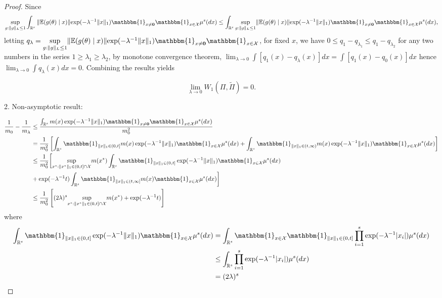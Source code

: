 \documentclass[10pt,fleqn]{article}
\newcommand{\be}{\begin{equation}\begin{aligned}}
\newcommand{\ee}{\end{aligned}\end{equation}}
\DeclareMathOperator{\1}{\mathbbm{1}}
\begin{document}
\begin{proof}[Proof]
Since 
$$ \underset{g:\|g\|_L\le 1}\sup\int_{\mathbb{R}^{s}} \| \mathbb{E}(g(\theta) \mid x) \|{ \exp(- \lambda^{-1} \| x\|_1)}   
\mathbbm{1}_{x \neq \bf 0} \mathbbm{1}_{x\in
\mathcal X}\mu^{s}(d x) \le\int_{\mathbb{R}^{s}}  \underset{g:\|g\|_L\le 1}\sup \mathbb{\|E}(g(\theta) \mid x)\|{ \exp(- \lambda^{-1} \| x\|_1)}   
\mathbbm{1}_{x \neq \bf 0} \mathbbm{1}_{x\in
\mathcal X}\mu^{s}(d x),$$
letting $q_\lambda=       \underset{g:\|g\|_L\le 1}\sup \mathbb{\|E}(g(\theta) \mid x)\|{ \exp(- \lambda^{-1} \| x\|_1)}   
\mathbbm{1}_{x \neq \bf 0}  \mathbbm{1}_{x\in
\mathcal X}$, for fixed $x$, we have $0\le q_1-q_{\lambda_1}\le q_1-q_{\lambda_2}$ for any two numbers in the series $1\ge\lambda_1\ge \lambda_2$, by monotone convergence theorem, $\lim_{\lambda\rightarrow 0}\int [ q_1(x)-q_\lambda(x)]dx = \int [q_1(x)- q_0(x) ]dx$ hence $\lim_{\lambda\rightarrow 0}\int q_\lambda(x)dx =0$. Combining the results yields 



\begin{equation}
\underset{\lambda \rightarrow 0}\lim W_1(\Pi,\tilde\Pi)=0.        \end{equation}

2. Non-asymptotic result:


\begin{equation}
\label{wass1}
\begin{aligned}
\frac{1}{m_0}-\frac{1}{m_\lambda} & \le  \frac{    \int_{\mathbb{R}^{s}}  m(x)\exp(- \lambda^{-1} \| x\|_1 )\mathbbm{1}_{x \neq \bf 0}\mathbbm{1}_{x\in
\mathcal X}\mu^{s}(d x) } {  m_0^2}  \\
&= \frac{1}{ m_0^2} \left[ \int_{\mathbb{R}^{s}} \mathbbm{1}_{\|x\|_1\in(0,t]}  m(x) \exp(- \lambda^{-1} \| x\|_1  )\mathbbm{1}_{x\in
\mathcal X}\mu^{s}(d x) + \int_{\mathbb{R}^{s}}
 \mathbbm{1}_{\|x\|_1\in(t,\infty)}  m(x) \exp(- \lambda^{-1} \| x\|_1  )
 \mathbbm{1}_{x\in
\mathcal X} \mu^{s}(d x) \right] \\
&\le \frac{1}{ m_0^2} \bigg[  \underset{x^{*}:\|x^{*}\|_1\in(0,t]\cap
\mathcal X}\sup m(x^{*}) \int_{\mathbb{R}^{s}}\mathbbm{1}_{\|x\|_1\in(0,t]}  \exp(- \lambda^{-1} \|x\|_1 )\mathbbm{1}_{x\in
\mathcal X}\mu^{s}(d x) \\ &+ \exp(- \lambda^{-1} t) \int_{\mathbb{R}^{s}}\mathbbm{1}_{\|x\|_1\in(t,\infty]}  m(x)\mathbbm{1}_{x\in
\mathcal X}\mu^{s}(d x)   \bigg] \\
&\le \frac{1}{ m_0^2} \left[(2\lambda)^s  \underset{x^{*}:\|x^{*}\|_1\in(0,t]\cap
\mathcal X}\sup m(x^{*})  + \exp(- \lambda^{-1} t ) \right] 
\end{aligned}
\end{equation}
where 
\be
\int_{\mathbb{R}^{s}}\mathbbm{1}_{\|x\|_1\in(0,t]}  \exp(- \lambda^{-1} \|x\|_1 )\mathbbm{1}_{x\in
\mathcal X}\mu^{s}(d x)  &= \int_{\mathbb{R}^{s}} \mathbbm{1}_{x\in
\mathcal X}\mathbbm{1}_{\|x\|_1\in(0,t]} \prod_{i=1}^s \exp(- \lambda^{-1} |x_i| )\mu^{s}(d x) \\
&\le   \int_{\mathbb{R}^{s}} \prod_{i=1}^s \exp(- \lambda^{-1} |x_i| )\mu^{s}(d x) \\
&=   (2\lambda)^s \\
\ee


\end{proof}
\end{document}

